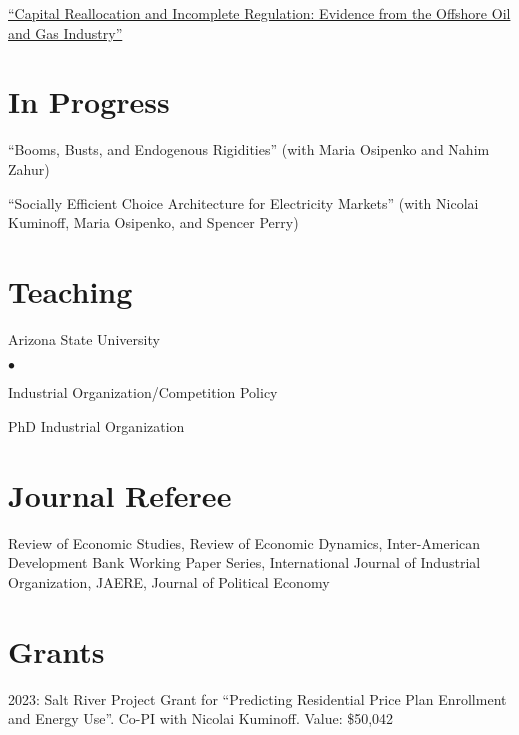 \documentclass[margin,line]{res}
\newenvironment{list1}{
  \begin{list}{\ding{113}}{%
      \setlength{\itemsep}{.025in}
      \setlength{\parsep}{0in} \setlength{\parskip}{0in}
      \setlength{\topsep}{0in} \setlength{\partopsep}{0in}
      \setlength{\leftmargin}{0.17in}}}{\end{list}}
\newenvironment{list2}{
  \begin{list}{$\bullet$}{%
      \setlength{\itemsep}{0in}
      \setlength{\parsep}{0in} \setlength{\parskip}{0in}
      \setlength{\topsep}{0in} \setlength{\partopsep}{0in}
      \setlength{\leftmargin}{0.2in}}}{\end{list}}
\begin{document}
\begin{resume}
\begin{list1}
\item[] \href{https://nvreug.github.io/paper/oil_incomplete.pdf}{``Capital Reallocation and Incomplete Regulation: Evidence from the Offshore Oil and Gas Industry''}

\end{list1}

\section{In Progress}
\begin{list1}
	\item[] ``Booms, Busts, and Endogenous Rigidities'' (with Maria Osipenko and Nahim Zahur)
	\item[] ``Socially Efficient Choice Architecture for Electricity Markets'' (with Nicolai Kuminoff, Maria Osipenko, and Spencer Perry)
\end{list1}

\section{Teaching}
\begin{list1}
	\item[] Arizona State University
	\begin{list2}
		\item[] Industrial Organization/Competition Policy 
		\item[] PhD Industrial Organization 
	\end{list2}
\end{list1}

\section{Journal Referee}
\begin{list1}
	\item[] Review of Economic Studies, Review of Economic Dynamics, Inter-American Development Bank Working Paper Series, International Journal of Industrial Organization, JAERE, Journal of Political Economy
\end{list1}

\section{Grants}
\begin{list1}
	\item[] 2023: Salt River Project Grant for ``Predicting Residential Price Plan Enrollment and Energy Use''. Co-PI with Nicolai Kuminoff. Value: \$50,042
\end{list1}


\end{resume}
\end{document}

